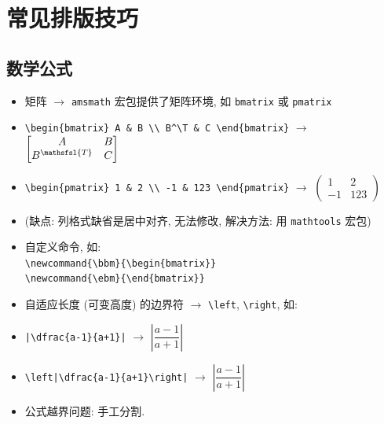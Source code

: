 \documentclass[openany]{MathematicalModelCaseStudyReport}  %
\numberwithin{algorithm}{chapter}
\newcommand{\bbm}{\begin{bmatrix}}
\newcommand{\ebm}{\end{bmatrix}}
\newcommand{\T}{\mathsfsl{T}}
\begin{document}
\chapter{常见排版技巧}

\section{数学公式}

\begin{itemize}
  \item 矩阵 $\to$ \verb|amsmath| 宏包提供了矩阵环境, 如 \Verb|bmatrix| 或 \Verb|pmatrix|
  \item[] \Verb|\begin{bmatrix} A & B \\ B^\T & C \end{bmatrix}|
    $\to$ $\bbm A & B \\ B^\T & C \ebm$
  \item[] \Verb|\begin{pmatrix} 1 & 2 \\ -1 & 123 \end{pmatrix}|
    $\to$ $\begin{pmatrix} 1 & 2 \\ -1 & 123 \end{pmatrix}$
  \item[] (缺点: 列格式缺省是居中对齐, 无法修改, 解决方法: 用 \Verb|mathtools| 宏包)


  \item 自定义命令, 如: \\
    \Verb|\newcommand{\bbm}{\begin{bmatrix}}| \\
    \Verb|\newcommand{\ebm}{\end{bmatrix}}|

  \item 自适应长度 (可变高度) 的边界符 $\to$ \Verb|\left|, \Verb|\right|, 如:
  \item[] \Verb<|\dfrac{a-1}{a+1}|<
    $\to$ $|\dfrac{a-1}{a+1}|$
  \item[] \Verb<\left|\dfrac{a-1}{a+1}\right|<
    $\to$ $\left|\dfrac{a-1}{a+1}\right|$

  \item 公式越界问题: 手工分割.
\end{itemize}
\end{document}
